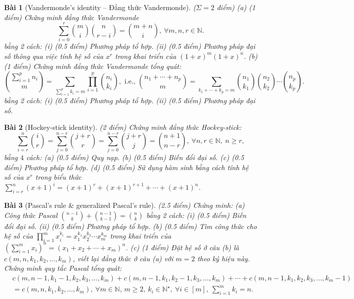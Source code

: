 \documentclass{article}
\newtheorem{baitoan}{Bài}
\begin{document}
\begin{baitoan}[Vandermonde's identity -- Đẳng thức Vandermonde]
    {\rm($\Sigma = 2$ điểm)} (a) {\rm(1 điểm)} Chứng minh đẳng thức Vandermonde
    \begin{equation*}
        \sum_{i=0}^r \binom{m}{i}\binom{n}{r - i} = \binom{m + n}{i},\ \forall m,n,r\in\mathbb{N}.
    \end{equation*}
    bằng 2 cách: (i) {\rm(0.5 điểm)} Phương pháp tổ hợp. (ii) {\rm(0.5 điểm)} Phương pháp đại số thông qua việc tính hệ số của $x^r$ trong khai triển của $(1 + x)^m(1 + x)^n$. (b) {\rm(1 điểm)} Chứng minh đẳng thức Vandermonde tổng quát:
    \begin{equation*}
        \binom{\sum_{i=1}^p n_i}{m} = \sum_{\sum_{i=1}^p k_i = m} \prod_{i=1}^p \binom{n_i}{k_i},\mbox{ i.e., }\binom{n_1 + \cdots + n_p}{m} = \sum_{k_1 + \cdots + k_p = m} \binom{n_1}{k_1}\binom{n_2}{k_2}\cdots\binom{n_p}{k_p}.
    \end{equation*}
    bằng 2 cách: (i) {\rm(0.5 điểm)} Phương pháp tổ hợp. (ii) {\rm(0.5 điểm)} Phương pháp đại số.
\end{baitoan}

\begin{baitoan}[Hockey-stick identity]
    {\rm(2 điểm)} Chứng minh đẳng thức Hockey-stick:
    \begin{equation*}
        \sum_{i=r}^n \binom{i}{r} = \sum_{j=0}^{n - r} \binom{j + r}{r} = \sum_{j=0}^{n - r} \binom{j + r}{j} = \binom{n + 1}{n - r},\ \forall n,r\in\mathbb{N},\ n\ge r,
    \end{equation*}
    bằng $4$ cách: (a) {\rm(0.5 điểm)} Quy nạp. (b) {\rm(0.5 điểm)} Biến đổi đại số. (c) {\rm(0.5 điểm)} Phương pháp tổ hợp. (d) {\rm(0.5 điểm)} Sử dụng hàm sinh bằng cách tính hệ số của $x^r$ trong biểu thức $\sum_{i=r}^n (x + 1)^i = (x + 1)^r + (x + 1)^{r + 1} + \cdots + (x + 1)^n$.
\end{baitoan}

\begin{baitoan}[Pascal's rule \& generalized Pascal's rule]
     {\rm(2.5 điểm)} Chứng minh: (a) Công thức Pascal $\binom{n - 1}{k} + \binom{n - 1}{k - 1} = \binom{n}{k}$ bằng 2 cách: (i) {\rm(0.5 điểm)} Biến đổi đại số. (ii) {\rm(0.5 điểm)} Phương pháp tổ hợp. (b) {\rm(0.5 điểm)} Tìm công thức cho hệ số của $\prod_{i=1}^m x_i^{k_i} = x_1^{k_1}x_2^{k_2}\cdots x_m^{k_m}$ trong khai triển của $\left(\sum_{i=1}^m x_i\right)^n = (x_1 + x_2 + \cdots + x_m)^n$. (c) {\rm(1 điểm)} Đặt hệ số ở câu (b) là $c(m,n,k_1,k_2,\ldots,k_m)$, viết lại đẳng thức ở câu (a) với $m = 2$ theo ký hiệu này. Chứng minh quy tắc Pascal tổng quát:
     \begin{align*}
         &c(m,n - 1,k_1 - 1,k_2,k_3,\ldots,k_m) + c(m,n - 1,k_1,k_2 - 1,k_3,\ldots,k_m) + \cdots + c(m,n - 1,k_1,k_2,k_3,\ldots,k_m - 1)\\
         &= c(m,n,k_1,k_2,\ldots,k_m),\ \forall m\in\mathbb{N},\,m\ge2,\ k_i\in\mathbb{N}^\star,\ \forall i\in[m],\ \sum_{i=1}^m k_i = n.
     \end{align*}
\end{baitoan}
\end{document}
